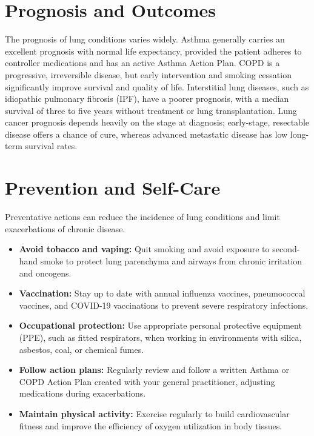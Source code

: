 \section*{Prognosis and Outcomes}
The prognosis of lung conditions varies widely. Asthma generally carries an excellent prognosis with normal life expectancy, provided the patient adheres to controller medications and has an active Asthma Action Plan. COPD is a progressive, irreversible disease, but early intervention and smoking cessation significantly improve survival and quality of life. Interstitial lung diseases, such as idiopathic pulmonary fibrosis (IPF), have a poorer prognosis, with a median survival of three to five years without treatment or lung transplantation. Lung cancer prognosis depends heavily on the stage at diagnosis; early-stage, resectable disease offers a chance of cure, whereas advanced metastatic disease has low long-term survival rates.

\section*{Prevention and Self-Care}
Preventative actions can reduce the incidence of lung conditions and limit exacerbations of chronic disease.
\begin{itemize}
    \item \textbf{Avoid tobacco and vaping:} Quit smoking and avoid exposure to second-hand smoke to protect lung parenchyma and airways from chronic irritation and oncogens.
    \item \textbf{Vaccination:} Stay up to date with annual influenza vaccines, pneumococcal vaccines, and COVID-19 vaccinations to prevent severe respiratory infections.
    \item \textbf{Occupational protection:} Use appropriate personal protective equipment (PPE), such as fitted respirators, when working in environments with silica, asbestos, coal, or chemical fumes.
    \item \textbf{Follow action plans:} Regularly review and follow a written Asthma or COPD Action Plan created with your general practitioner, adjusting medications during exacerbations.
    \item \textbf{Maintain physical activity:} Exercise regularly to build cardiovascular fitness and improve the efficiency of oxygen utilization in body tissues.
\end{itemize}

